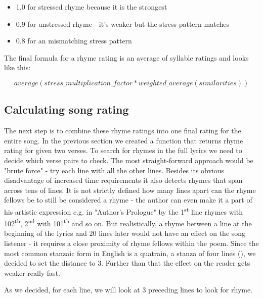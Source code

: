\begin{itemize}
	\item 1.0 for stressed rhyme because it is the strongest
	
	\item 0.9 for unstressed rhyme - it's weaker but the stress pattern matches
	
	\item 0.8 for an mismatching stress pattern
\end{itemize}


The final formula for a rhyme rating is an average of syllable ratings and looks like this:

\[average(stress\_multiplication\_factor*weighted\_average(similarities))\]


\subsection{Calculating song rating}

The next step is to combine these rhyme ratings into one final rating for the entire song. In the previous section we created a function that returns rhyme rating for given two verses. To search for rhymes in the full lyrics we need to decide which verse pairs to check. The most straight-forward approach would be "brute force" - try each line with all the other lines. Besides its obvious disadvantage of increased time requirements it also detects rhymes that span across tens of lines. It is not strictly defined how many lines apart can the rhyme fellows be to still be considered a rhyme - the author can even make it a part of his artistic expression  e.g. in "Author's Prologue" by \cite{thomas1952author} the 1\textsuperscript{st} line rhymes with 102\textsuperscript{th}, 2\textsuperscript{nd} with 101\textsuperscript{th} and so on. But realistically, a rhyme between a line at the beginning of the lyrics and 20 lines later would not have an effect on the song listener - it requires a close proximity of rhyme fellows within the poem. Since the most common stanzaic form in English is a quatrain, a stanza of four lines (\cite{eastman1970norton}), we decided to set the distance to 3. Further than that the effect on the reader gets weaker really fast. 

As we decided, for each line, we will look at 3 preceding lines to look for rhyme.

